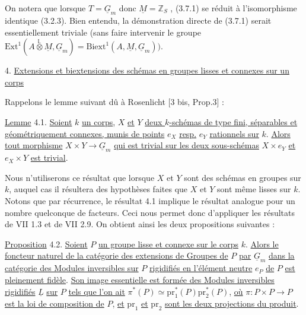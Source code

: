 On notera que lorsque $T = \underline{G}_m$ donc $\underline{M} = \mathbb{Z}_S$ , (3.7.1) se réduit à l'isomorphisme identique (3.2.3). Bien entendu, la démonstration directe de (3.7.1) serait essentiellement triviale (sans faire intervenir le groupe $\mathrm{Ext}^1(A \stackrel{\mathbb{L}}{\otimes} \underline{M},\underline{G}_m) =\mathrm{Biext}^1(A,\underline{M},\underline{G}_m))$.




4. \underline{Extensions et biextensions des schémas en groupes lisses et connexes sur un corps}

Rappelons le lemme suivant dû à Rosenlicht [3 bis, Prop.3] :

\underline{Lemme} 4.1. \underline{Soient} $k$ \underline{un corps}, $X$ \underline{et} $Y$ \underline{deux $k$-schémas de type fini, séparables et géométriquement connexes, munis de points} $e_X$ \underline{resp.} $e_Y$ \underline{rationnels sur} $k$. \underline{Alors tout morphisme} $X \times Y \longrightarrow \underline{G}_m$ \underline{qui est trivial sur les deux sous-schémas} $X \times e_Y$ \underline{et} $e_X \times Y$ \underline{est trivial}.

Nous n'utiliserons ce résultat que lorsque $X$ et $Y$ sont des schémas en groupes sur $k$, auquel cas il résultera des hypothèses faites que $X$ et $Y$ sont même lisses sur $k$. Notons que par récurrence, le résultat 4.1 implique le résultat analogue pour un nombre quelconque de facteurs. Ceci nous permet donc d'appliquer les résultats de VII 1.3 et de VII 2.9. On obtient ainsi les deux propositions suivantes :

\underline{Proposition} 4.2. \underline{Soient} $P$ \underline{un groupe lisse et connexe sur le corps} $k$. \underline{Alors le foncteur naturel de la catégorie des extensions de Groupes de} $P$ \underline{par} $\underline{G}_m$ \underline{dans la catégorie des Modules inversibles sur} $P$ \underline{rigidifiés en l'élément neutre} $e_P$ \underline{de} $P$ \underline{est pleinement fidèle}. \underline{Son image essentielle est formée des Modules inversibles rigidifiés} $\underline{L}$ \underline{sur} $P$ \underline{tels que l'on ait} $\pi^*(P) \simeq \mathrm{pr}_1^*(P)\mathrm{pr}_2^*(P)$, \underline{où} $\pi : P \times P \longrightarrow P$ \underline{est la loi de composition de} $P$, \underline{et} $\mathrm{pr}_1$ \underline{et} $\mathrm{pr}_2$ \underline{sont les deux projections du produit}.

